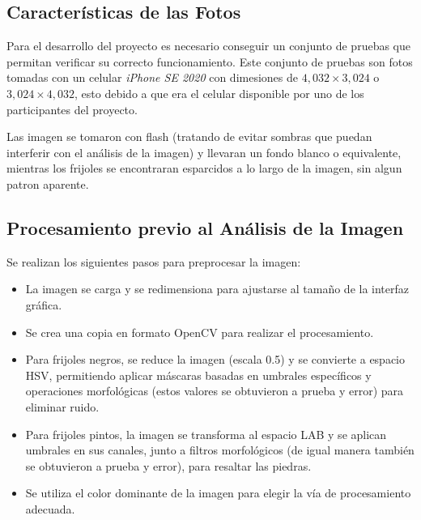 \documentclass[conference]{IEEEtran}
\begin{document}
    \subsection{Características de las Fotos}
    Para el desarrollo del proyecto es necesario conseguir un conjunto de pruebas que permitan verificar su correcto funcionamiento. Este conjunto de pruebas son fotos tomadas con un celular \textit{iPhone SE 2020}\cite{iphone} con dimesiones de $4,032 \times 3,024$ o $3,024 \times 4,032$, esto debido a que era el celular disponible por uno de los participantes del proyecto.

    Las imagen se tomaron con flash (tratando de evitar sombras que puedan interferir con el análisis de la imagen) y llevaran un fondo blanco o equivalente, mientras los frijoles se encontraran esparcidos a lo largo de la imagen, sin algun patron aparente.

    \subsection{Procesamiento previo al Análisis de la Imagen}
    Se realizan los siguientes pasos para preprocesar la imagen:
    \begin{itemize}
        \item La imagen se carga y se redimensiona para ajustarse al tamaño de la interfaz gráfica.
        \item Se crea una copia en formato OpenCV para realizar el procesamiento.
        \item Para frijoles negros, se reduce la imagen (escala 0.5) y se convierte a espacio HSV, permitiendo aplicar máscaras basadas en umbrales específicos y operaciones morfológicas (estos valores se obtuvieron a prueba y error) para eliminar ruido.
        \item Para frijoles pintos, la imagen se transforma al espacio LAB y se aplican umbrales en sus canales, junto a filtros morfológicos (de igual manera también se obtuvieron a prueba y error), para resaltar las piedras.
        \item Se utiliza el color dominante de la imagen para elegir la vía de procesamiento adecuada.
    \end{itemize}
    
\end{document}
